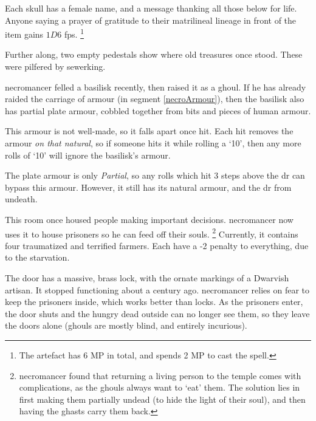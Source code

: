 \begin{multicols}{2}
Each skull has a female name, and a message thanking all those below for life.
Anyone saying a prayer of gratitude to their matrilineal lineage in front of the item gains $1D6$ \glspl{fp}.%
\footnote{The \gls{artefact} has 6 MP in total, and spends 2 MP to cast the spell.}

Further along, two empty pedestals show where old treasures once stood.
These were pilfered by \gls{sewerking}.%


\Gls{necromancer} felled a basilisk recently, then raised it as a ghoul.
If he has already raided the carriage of armour (in \gls{segment} \vref{necroArmour}), then the basilisk also has partial plate armour, cobbled together from bits and pieces of human armour.

This armour is not well-made, so it falls apart once hit.
Each hit removes the armour \textit{on that \gls{natural}}, so if someone hits it while rolling a `10', then any more rolls of `10' will ignore the basilisk's armour.

The plate armour is only \textit{Partial}, so any rolls which hit 3 steps above the \gls{dr} can bypass this armour.
However, it still has its natural armour, and the \gls{dr} from undeath.%

\undeadBasilisk


This room once housed people making important decisions.
\Gls{necromancer} now uses it to house prisoners so he can feed off their souls.%
\footnote{\Gls{necromancer} found that returning a living person to the temple comes with complications, as the ghouls always want to `eat' them.
The solution lies in first making them partially undead (to hide the light of their soul), and then having the ghasts carry them back.}
Currently, it contains four traumatized and terrified farmers.
Each have a -2 penalty to everything, due to the starvation.

The door has a massive, brass lock, with the ornate markings of a Dwarvish artisan.
It stopped functioning about a century ago.
\Gls{necromancer} relies on fear to keep the prisoners inside, which works better than locks.
As the prisoners enter, the door shuts and the hungry dead outside can no longer see them, so they leave the doors alone (ghouls are mostly blind, and entirely incurious).



\end{multicols}
